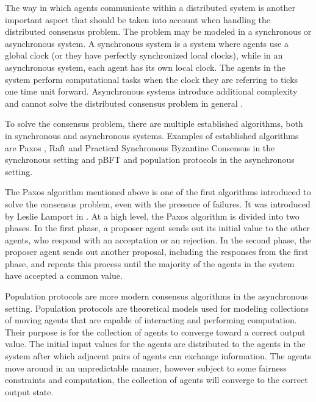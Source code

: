 The way in which agents communicate within a distributed system is another important aspect that should be taken into account when handling the distributed consensus problem. The problem may be modeled in a synchronous or asynchronous system. A synchronous system is a system where agents use a global clock (or they have perfectly synchronized local clocks), while in an asynchronous system, each agent has its own local clock. The agents in the system perform computational tasks when the clock they are referring to ticks one time unit forward. Asynchronous systems introduce additional complexity and cannot solve the distributed consensus problem in general \cite{fischerImpossibilityDistributedConsensus}.

To solve the consensus problem, there are multiple established algorithms, both in synchronous and asynchronous systems. Examples of established algorithms are Paxos \cite{lamportFastPaxos2006}, Raft \cite{ongaroSearchUnderstandableConsensus} and Practical Synchronous Byzantine Consensus \cite{renPracticalSynchronousByzantine} in the synchronous setting and pBFT \cite{castroPracticalByzantineFault} and population protocols \cite{aspnesIntroductionPopulationProtocols2009} in the asynchronous setting.

The Paxos algorithm mentioned above is one of the first algorithms introduced to solve the consensus problem, even with the presence of failures. It was introduced by Leslie Lamport  in \cite{lamportPartTimeParliment1998}. At a high level, the Paxos algorithm is divided into two phases. In the first phase, a proposer agent sends out its initial value to the other agents, who respond with an acceptation or an rejection. In the second phase, the proposer agent sends out another proposal, including the responses from the first phase, and repeats this process until the majority of the agents in the system have accepted a common value. 

Population protocols are more modern consensus algorithms in the asynchronous setting. Population protocols are theoretical models used for modeling collections of moving agents that are capable of interacting and performing computation. Their purpose is for the collection of agents to converge toward a correct output value. The initial input values for the agents are distributed to the agents in the system after which adjacent pairs of agents can exchange information. The agents move around in an unpredictable manner, however subject to some fairness constraints and computation, the collection of agents will converge to the correct output state. \cite{aspnesIntroductionPopulationProtocols2009} 

